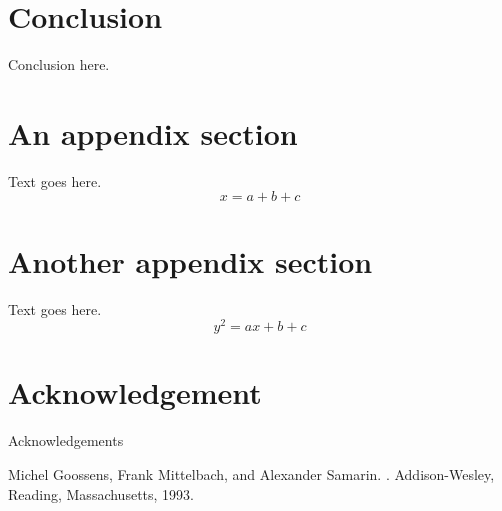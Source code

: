 \documentclass{pramana}
\begin{document}





\section{Conclusion}
Conclusion here.



\appendix

\section{An appendix section}
Text goes here.
\begin{equation}
x=a+b+c
\end{equation}
\section{Another appendix section}
Text goes here.
\begin{equation}
y^2=ax+b+c
\end{equation}
\section*{Acknowledgement}
Acknowledgements


\begin{thebibliography}{99} 
Michel Goossens, Frank Mittelbach, and Alexander Samarin. 
. 
Addison-Wesley, Reading, Massachusetts, 1993.
\end{thebibliography}
\end{document}
